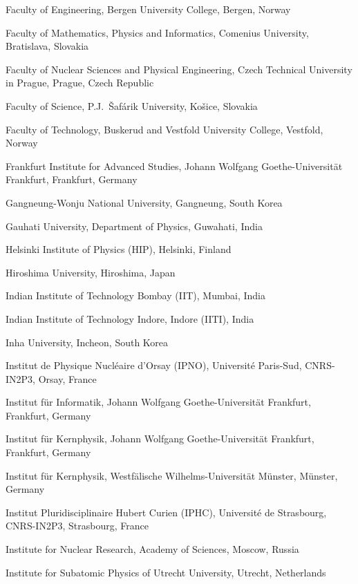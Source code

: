 \begin{flushleft}
\begin{Authlist}
\item {}Faculty of Engineering, Bergen University College, Bergen, Norway
\item {}Faculty of Mathematics, Physics and Informatics, Comenius University, Bratislava, Slovakia
\item {}Faculty of Nuclear Sciences and Physical Engineering, Czech Technical University in Prague, Prague, Czech Republic
\item {}Faculty of Science, P.J.~\v{S}af\'{a}rik University, Ko\v{s}ice, Slovakia
\item {}Faculty of Technology, Buskerud and Vestfold University College, Vestfold, Norway
\item {}Frankfurt Institute for Advanced Studies, Johann Wolfgang Goethe-Universit\"{a}t Frankfurt, Frankfurt, Germany
\item {}Gangneung-Wonju National University, Gangneung, South Korea
\item {}Gauhati University, Department of Physics, Guwahati, India
\item {}Helsinki Institute of Physics (HIP), Helsinki, Finland
\item {}Hiroshima University, Hiroshima, Japan
\item {}Indian Institute of Technology Bombay (IIT), Mumbai, India
\item {}Indian Institute of Technology Indore, Indore (IITI), India
\item {}Inha University, Incheon, South Korea
\item {}Institut de Physique Nucl\'eaire d'Orsay (IPNO), Universit\'e Paris-Sud, CNRS-IN2P3, Orsay, France
\item {}Institut f\"{u}r Informatik, Johann Wolfgang Goethe-Universit\"{a}t Frankfurt, Frankfurt, Germany
\item {}Institut f\"{u}r Kernphysik, Johann Wolfgang Goethe-Universit\"{a}t Frankfurt, Frankfurt, Germany
\item {}Institut f\"{u}r Kernphysik, Westf\"{a}lische Wilhelms-Universit\"{a}t M\"{u}nster, M\"{u}nster, Germany
\item {}Institut Pluridisciplinaire Hubert Curien (IPHC), Universit\'{e} de Strasbourg, CNRS-IN2P3, Strasbourg, France
\item {}Institute for Nuclear Research, Academy of Sciences, Moscow, Russia
\item {}Institute for Subatomic Physics of Utrecht University, Utrecht, Netherlands

\end{Authlist}
\end{flushleft}
